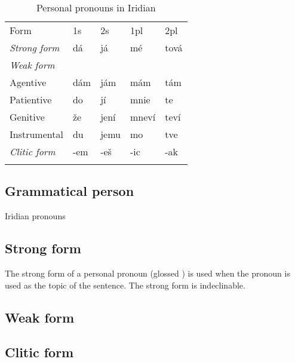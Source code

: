 \begin{table}[h!]
    \small
	\caption{Personal pronouns in Iridian}
	\medskip
	\begin{tabu} to 0.9 \textwidth {Y[3]YYYY}
		\toprule \addlinespace
        {\sc Form} & {\sc 1s} & {\sc 2s} & {\sc 1pl} & {\sc 2pl}\\\addlinespace
		\midrule\addlinespace
        \emph{Strong form}  & dá      & já      & m\'e      & tová \\\addlinespace
        \emph{Weak form}    &           &           &           & \\\addlinespace
        \quad Agentive      & dám     & jám     & mám     & tám\\\addlinespace
        \quad Patientive    & do        & jí      & mnie      & te\\\addlinespace
        \quad Genitive      & že    & jení    & mneví   & teví\\\addlinespace
        \quad Instrumental  & du        & jemu      & mo        & tve\\\addlinespace
        \emph{Clitic form}  & -em       & -eš   & -ic       & -ak\\\addlinespace
        \bottomrule
	\end{tabu}

\end{table}

\subsection{Grammatical person}
Iridian pronouns

\subsection{Strong form}

The strong form of a personal pronoun (glossed ) is used when the pronoun is used as the topic of the sentence. The strong form is indeclinable.

\subsection{Weak form}

\subsection{Clitic form}

